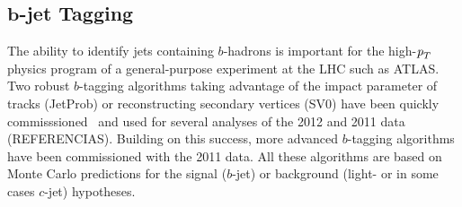 \begin{itemize}
\begin{itemize}
\section{ ${\bm b}$-jet Tagging}\label{sec:btagging}











The ability to identify jets containing $b$-hadrons is important for the high-${\emph{p}_{T}}$ physics program of a general-purpose experiment at the LHC such as ATLAS. Two robust $b$-tagging algorithms taking advantage of the impact parameter of tracks (JetProb) or reconstructing secondary vertices (SV0) have been quickly commisssioned~\cite{ATLAS-CONF-2010-091}\cite{ATLAS-CONF-2010-042} and used for several analyses of the 2012 and 2011 data (REFERENCIAS).
Building on this success, more advanced $b$-tagging algorithms have been commissioned with the 2011 data. All these algorithms are based on Monte Carlo predictions for the signal ($b$-jet) or background (light- or in some cases $c$-jet) hypotheses.


\end{itemize}
\end{itemize}
